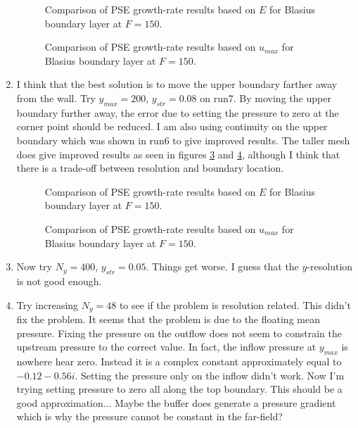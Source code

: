 \documentclass[12pt]{article}
\begin{document}
\begin{enumerate}
\begin{figure}
\centering \epsfxsize=4.5in 
\setvlabel{$\gamma$}
\caption {Comparison of PSE growth-rate results based on $E$ for Blasius
boundary layer at $F=150$. \label{f:cont}}
\end{figure}

\begin{figure}
\centering \epsfxsize=4.5in 
\setvlabel{$\gamma$}
\caption {Comparison of PSE growth-rate results based on $u_{max}$ for Blasius
boundary layer at $F=150$. \label{f:cont_umax}}
\end{figure}

\item I think that the best solution is to move the upper boundary farther
away from the wall.  Try $y_{max}=200$, $y_{str}=0.08$ on run7.  By moving the
upper boundary further away, the error due to setting the pressure to zero at
the corner point should be reduced.  I am also using continuity on the upper
boundary which was shown in run6 to give improved results.  The taller mesh
does give improved results as seen in figures \ref{f:ymax} and
\ref{f:ymax_umax}, although I think that there is a trade-off between
resolution and boundary location.

\begin{figure}
\centering \epsfxsize=4.5in 
\setvlabel{$\gamma$}
\caption {Comparison of PSE growth-rate results based on $E$ for Blasius
boundary layer at $F=150$. \label{f:ymax}}
\end{figure}

\begin{figure}
\centering \epsfxsize=4.5in 
\setvlabel{$\gamma$}
\caption {Comparison of PSE growth-rate results based on $u_{max}$ for Blasius
boundary layer at $F=150$. \label{f:ymax_umax}}
\end{figure}

\item Now try $N_y = 400$, $y_{str}=0.05$. Things get worse.  I guess that the
$y$-resolution is not good enough.  

\item Try increasing $N_y = 48$ to see if the problem is resolution
related. This didn't fix the problem.  It seems that the problem is due to the
floating mean pressure.  Fixing the pressure on the outflow does not seem to
constrain the upstream pressure to the correct value.  In fact, the inflow
pressure at $y_{max}$ is nowhere hear zero.  Instead it is a complex constant
approximately equal to $-0.12 - 0.56i$. Setting the pressure only on the
inflow didn't work.  Now I'm trying setting pressure to zero all along the top
boundary.  This should be a good approximation...  Maybe the buffer does
generate a pressure gradient which is why the pressure cannot be constant in
the far-field?


\end{enumerate}
\end{document}
